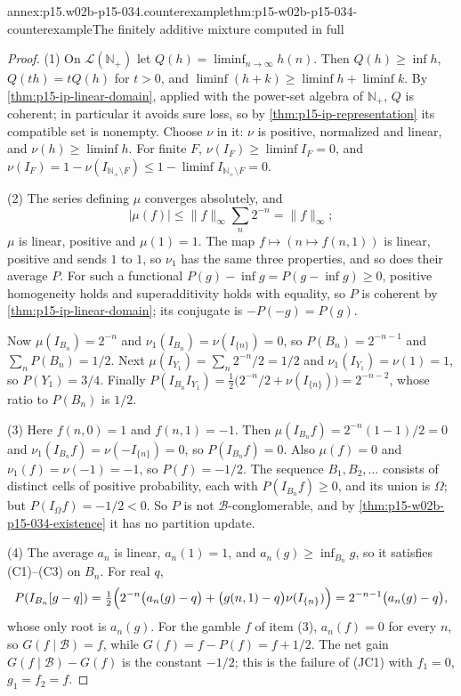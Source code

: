 \begin{annexitem}{annex:p15.w02b-p15-034.counterexample}{thm:p15-w02b-p15-034-counterexample}{The finitely additive mixture computed in full}
\begin{proof}
(1) On \(\mathcal L(\mathbb N_+)\) let
\(Q(h)=\liminf_{n\to\infty}h(n)\). Then \(Q(h)\geq\inf h\),
\(Q(th)=tQ(h)\) for \(t>0\), and
\(\liminf(h+k)\geq\liminf h+\liminf k\). By
\cref{thm:p15-ip-linear-domain}, applied with the power-set algebra of
\(\mathbb N_+\), \(Q\) is coherent; in particular it avoids sure loss, so by
\cref{thm:p15-ip-representation} its compatible set is nonempty. Choose
\(\nu\) in it: \(\nu\) is positive, normalized and linear, and
\(\nu(h)\geq\liminf h\). For finite \(F\), \(\nu(I_F)\geq\liminf I_F=0\),
and
\(\nu(I_F)=1-\nu(I_{\mathbb N_+\setminus F})\leq1-\liminf I_{\mathbb N_+\setminus F}=0\).

(2) The series defining \(\mu\) converges absolutely, and
\[
 |\mu(f)|\leq\|f\|_\infty\sum_n2^{-n}=\|f\|_\infty;
\]
\(\mu\) is linear,
positive and \(\mu(1)=1\). The map \(f\mapsto(n\mapsto f(n,1))\) is linear,
positive and sends \(1\) to \(1\), so \(\nu_1\) has the same three
properties, and so does their average \(P\). For such a functional
\(P(g)-\inf g=P(g-\inf g)\geq0\), positive homogeneity holds and
superadditivity holds with equality, so \(P\) is coherent by
\cref{thm:p15-ip-linear-domain}; its conjugate is
\(-P(-g)=P(g)\).

Now \(\mu(I_{B_n})=2^{-n}\) and \(\nu_1(I_{B_n})=\nu(I_{\{n\}})=0\), so
\(P(B_n)=2^{-n-1}\) and \(\sum_nP(B_n)=1/2\). Next
\(\mu(I_{Y_1})=\sum_n2^{-n}/2=1/2\) and \(\nu_1(I_{Y_1})=\nu(1)=1\), so
\(P(Y_1)=3/4\). Finally
\(P(I_{B_n}I_{Y_1})=\tfrac12\bigl(2^{-n}/2+\nu(I_{\{n\}})\bigr)=2^{-n-2}\),
whose ratio to \(P(B_n)\) is \(1/2\).

(3) Here \(f(n,0)=1\) and \(f(n,1)=-1\). Then
\(\mu(I_{B_n}f)=2^{-n}(1-1)/2=0\) and
\(\nu_1(I_{B_n}f)=\nu(-I_{\{n\}})=0\), so \(P(I_{B_n}f)=0\). Also
\(\mu(f)=0\) and \(\nu_1(f)=\nu(-1)=-1\), so \(P(f)=-1/2\). The sequence
\(B_1,B_2,\ldots\) consists of distinct cells of positive probability, each
with \(P(I_{B_n}f)\geq0\), and its union is \(\Omega\); but
\(P(I_\Omega f)=-1/2<0\). So \(P\) is not \(\mathcal B\)-conglomerable, and
by \cref{thm:p15-w02b-p15-034-existence} it has no partition update.

(4) The average \(a_n\) is linear, \(a_n(1)=1\), and
\(a_n(g)\geq\inf_{B_n}g\), so it satisfies (C1)--(C3) on \(B_n\). For real
\(q\),
\[
 P(I_{B_n}[g-q])=\tfrac12\Bigl(2^{-n}\bigl(a_n(g)-q\bigr)
 +\bigl(g(n,1)-q\bigr)\nu(I_{\{n\}})\Bigr)=2^{-n-1}\bigl(a_n(g)-q\bigr),
\]
whose only root is \(a_n(g)\). For the gamble \(f\) of item (3),
\(a_n(f)=0\) for every \(n\), so
\(G(f\mid\mathcal B)=f\), while \(G(f)=f-P(f)=f+1/2\). The net gain
\(G(f\mid\mathcal B)-G(f)\) is the constant \(-1/2\); this is the
failure of (JC1) with \(f_1=0\), \(g_1=f_2=f\).


\end{proof}
\end{annexitem}
